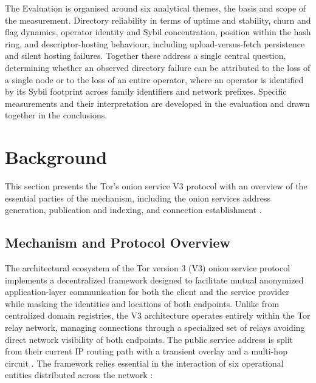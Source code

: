 \documentclass[conference]{IEEEtran}
\begin{document}
The Evaluation is organised around six analytical themes, the basis and scope of the measurement. Directory reliability in terms of uptime and stability, churn 
and flag dynamics, operator identity and Sybil concentration, position within the hash ring, and descriptor-hosting behaviour, including upload-versus-fetch 
persistence and silent hosting failures. Together these address a single central question, determining whether an observed directory failure can be attributed 
to the loss of a single node or to the loss of an entire operator, where an operator is identified by its Sybil footprint across family identifiers and network 
prefixes. Specific measurements and their interpretation are developed in the evaluation and drawn together in the conclusions.

\section{Background}

This section presents the Tor's onion service V3 protocol with an overview of the essential parties of the
mechanism, including the onion services address generation, publication and indexing, and connection establishment \cite{tor_rendspec, tor_onion_overview}.

\subsection{Mechanism and Protocol Overview}

The architectural ecosystem of the Tor version 3 (V3) onion service protocol implements a decentralized framework designed to facilitate mutual anonymized application-layer
communication for both the client and the service provider while masking the identities and locations of both endpoints. Unlike from centralized domain registries, the V3
architecture operates entirely within the Tor relay network, managing connections through a specialized set of relays avoiding direct network visibility of both endpoints.
The public service address is split from their current IP routing path with a transient overlay and a multi-hop circuit \cite{dingledine2004tor}. The framework relies essential in the interaction
of six operational entities distributed across the network \cite{tor_rendspec, tor_onion_overview}:
\end{document}
